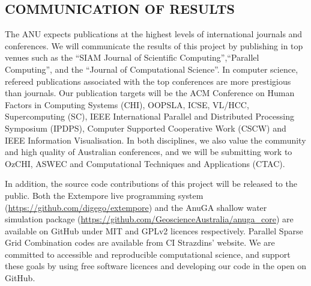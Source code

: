\subsection*{COMMUNICATION OF RESULTS}

The ANU expects publications at the highest levels of international
journals and conferences. We will communicate the results of this
project by publishing in top venues such as the ``SIAM Journal of
Scientific Computing'',``Parallel Computing'', and the ``Journal of
Computational Science''. In computer science, refereed publications
associated with the top conferences are more prestigious than
journals. Our publication targets will be the ACM Conference on Human
Factors in Computing Systems (CHI), OOPSLA, ICSE, VL/HCC,
Supercomputing (SC), IEEE International Parallel and Distributed
Processing Symposium (IPDPS), Computer Supported Cooperative Work
(CSCW) and IEEE Information Visualisation. In both disciplines, we
also value the community and high quality of Australian conferences,
and we will be submitting work to OzCHI, ASWEC and Computational
Techniques and Applications (CTAC).


In addition, the source code contributions of this project will be
released to the public. Both the Extempore live programming system
(\url{https://github.com/digego/extempore}) and the AnuGA shallow
water simulation package
(\url{https://github.com/GeoscienceAustralia/anuga_core}) are
available on GitHub under MIT and GPLv2 licences respectively.
Parallel Sparse Grid Combination codes are available from CI
Strazdins' website.  We are committed to accessible and reproducible
computational science, and support these goals by using free software
licences and developing our code in the open on GitHub.

